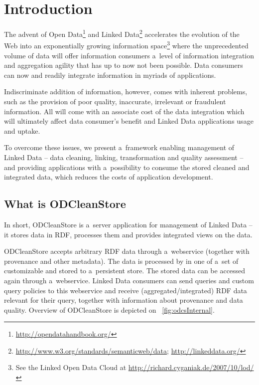 
\newcommand{\version}{0.3.7}
\newcommand{\documentname}{\refusermanual}





\renewcommand{\contentsname}{Contents}
\tableofcontents
\bigskip

\newpage


\chapter{Introduction}
\label{chap:introduction}

The advent of Open Data\footnote{\url{http://opendatahandbook.org/}} and Linked Data\footnote{\url{http://www.w3.org/standards/semanticweb/data}; \url{http://linkeddata.org/}}  accelerates the evolution of the Web into an exponentially growing information space\footnote{See the Linked Open Data Cloud at \url{http://richard.cyganiak.de/2007/10/lod/}} where the unprecedented volume of data will offer information consumers a~level of information integration and aggregation agility that has up to now not been possible. Data consumers can now  and readily integrate information in myriads of applications.

Indiscriminate addition of information, however, comes with inherent problems, such as the provision of poor quality, inaccurate, irrelevant or fraudulent information. All will come with an associate cost of the data integration which will ultimately affect data consumer's benefit and Linked Data applications usage and uptake.

To overcome these issues, we present a~framework enabling management of Linked Data -- data cleaning, linking, transformation and quality assessment -- and providing  applications with a~possibility to consume the stored cleaned and integrated data, which reduces the costs of application development.

\section{What is ODCleanStore}

In short, ODCleanStore is a~server application for management of Linked Data -- it stores data in RDF, processes them and provides integrated views on the data.

ODCleanStore accepts arbitrary RDF data through a~webservice (together with provenance and other metadata). The data is processed by  in one of a~set of customizable  and stored to a~persistent store. The stored data can be accessed again through a~webservice. Linked Data consumers can send queries and custom query policies to this webservice and receive (aggregated/integrated) RDF data relevant for their query, together with information about provenance and data quality. Overview of ODCleanStore is depicted on \figurename~\ref{fig:odcsInternal}.

